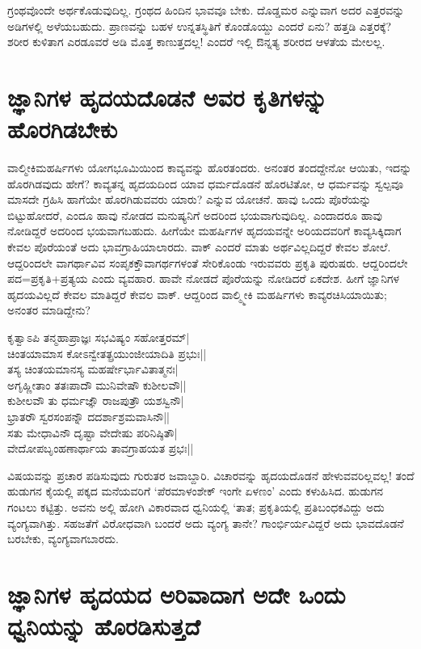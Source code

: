 ಗ್ರಂಥವೊಂದೇ ಅರ್ಥಕೊಡುವುದಿಲ್ಲ. ಗ್ರಂಥದ ಹಿಂದಿನ ಭಾವವೂ ಬೇಕು. ದೊಡ್ಡಮರ ಎನ್ನುವಾಗ ಅದರ ಎತ್ತರವನ್ನು ಅಡಿಗಳಲ್ಲಿ ಅಳೆಯಬಹುದು. ಪ್ರಾಣವನ್ನು ಬಹಳ ಉನ್ನತಸ್ಥಿತಿಗೆ ಕೊಂಡೊಯ್ದು ಎಂದರೆ ಏನು? ಹತ್ತಡಿ ಎತ್ತರಕ್ಕೆ? ಶರೀರ ಕುಳಿತಾಗ ಎರಡೂವರೆ ಅಡಿ ಮೊತ್ತ ಕಾಣುತ್ತದಲ್ಲ! ಎಂದರೆ ಇಲ್ಲಿ ಔನ್ನತ್ಯ ಶರೀರದ ಆಳತೆಯ ಮೇಲಲ್ಲ. 

\section*{ಜ್ಞಾನಿಗಳ ಹೃದಯದೊಡನೆ ಅವರ ಕೃತಿಗಳನ್ನು ಹೊರಗಿಡಬೇಕು}

ವಾಲ್ಮೀಕಿಮಹರ್ಷಿಗಳು ಯೋಗಭೂಮಿಯಿಂದ ಕಾವ್ಯವನ್ನು ಹೊರತಂದರು. ಅನಂತರ ತಂದದ್ದೇನೋ ಆಯಿತು, ಇದನ್ನು ಹೊರಗಿಡವುದು ಹೇಗೆ? ಕಾವ್ಯತನ್ನ ಹೃದಯದಿಂದ ಯಾವ ಧರ್ಮದೊಡನೆ ಹೊರಟಿತೋ, ಆ ಧರ್ಮವನ್ನು ಸ್ವಲ್ಪವೂ ಮಾಸದೇ ಗ್ರಹಿಸಿ ಹಾಗೆಯೇ ಹೊರಗಿಡುವವರು ಯಾರು? ಎನ್ನುವ ಯೋಚನೆ. ಹಾವು ಒಂದು ಪೊರೆಯನ್ನು ಬಿಟ್ಟುಹೋದರೆ, ಎಂದೂ ಹಾವು ನೋಡದ ಮನುಷ್ಯನಿಗೆ ಅದರಿಂದ ಭಯವಾಗುವುದಿಲ್ಲ. ಎಂದಾದರೂ ಹಾವು ನೋಡಿದ್ದರೆ ಅದರಿಂದ ಭಯವಾಗಬಹುದು. ಹೀಗೆಯೇ ಮಹರ್ಷಿಗಳ ಹೃದಯವನ್ನೇ ಅರಿಯದವರಿಗೆ ಕಾವ್ಯಸಿಕ್ಕಿದಾಗ ಕೇವಲ ಪೊರೆಯಂತೆ ಅದು ಭಾವಗ್ರಾಹಿಯಾಲಾರದು. ವಾಕ್ ಎಂದರೆ ಮಾತು ಅರ್ಥವಿಲ್ಲದಿದ್ದರೆ ಕೇವಲ ಶೋಲೆ. ಆದ್ದರಿಂದಲೇ ವಾಗರ್ಥಾವಿವ ಸಂಪೃಕಕ್ತೌವಾಗರ್ಥಗಳಂತೆ ಸೇರಿಕೊಂಡು ಇರುವವರು ಪ್ರಕೃತಿ ಪುರುಷರು. ಆದ್ದರಿಂದಲೇ ಪದ=ಪ್ರಕೃತಿ+ಪ್ರತ್ಯಯ ಎಂದು ವ್ಯವಹಾರ. ಹಾವೇ ನೋಡದೆ ಪೊರೆಯನ್ನು ನೋಡಿದರೆ ಏಕದೇಶ. ಹೀಗೆ ಜ್ಞಾನಿಗಳ ಹೃದಯವಿಲ್ಲದೆ ಕೇವಲ ಮಾತಿದ್ದರೆ ಕೇವಲ ವಾಕ್. ಆದ್ದರಿಂದ ವಾಲ್ಮ್ಮೀಕಿ ಮಹರ್ಷಿಗಳು ಕಾವ್ಯರಚಿಸಿಯಾಯಿತು; ಅನಂತರ ಮಾಡಿದ್ದೇನು? 

\begin{shloka}
ಕೃತ್ವಾಽಪಿ ತನ್ಮಹಾಪ್ರಾಜ್ಞಃ ಸಭವಿಷ್ಯಂ ಸಹೋತ್ತರಮ್|\label{238}\\
ಚಿಂತಯಾಮಾಸ ಕೋಽನ್ವೇತತ್ಪ್ರಯುಂಜೀಯಾದಿತಿ ಪ್ರಭುಃ||\\
ತಸ್ಯ ಚಿಂತಯಮಾನಸ್ಯ ಮಹರ್ಷೇರ್ಭಾವಿತಾತ್ಮನಃ|\\
ಅಗೃಹ್ಣೀತಾಂ ತತಃಪಾದೌ ಮುನಿವೇಷೌ ಕುಶೀಲವೌ||\\
ಕುಶೀಲವೌ ತು ಧರ್ಮಜ್ಞೌ ರಾಜಪುತ್ರೌ ಯಶಸ್ವಿನೌ|\\
ಭ್ರಾತರೌ ಸ್ವರಸಂಪನ್ನೌ ದದರ್ಶಾಶ್ರಮವಾಸಿನೌ||\\
ಸತು ಮೇಧಾವಿನೌ ದೃಷ್ಟಾ ವೇದೇಷು ಪರಿನಿಷ್ಠಿತೌ|\\
ವೇದೋಪಬೃಂಹಣಾರ್ಥಾಯ ತಾವಗ್ರಾಹಯತ ಪ್ರಭಃ||
\end{shloka}

ವಿಷಯವನ್ನು ಪ್ರಚಾರ ಪಡಿಸುವುದು ಗುರುತರ ಜವಾಬ್ದಾರಿ. ವಿಚಾರವನ್ನು ಹೃದಯದೊಡನೆ ಹೇಳುವವರಿಲ್ಲವಲ್ಲ! ತಂದೆ ಹುಡುಗನ ಕೈಯಲ್ಲಿ ಪಕ್ಕದ ಮನೆಯವರಿಗೆ `ಪೆರಮಾಳಂಶೇಕ್ ಇಂಗೇ ಏಳಣಂ' ಎಂದು ಕಳುಹಿಸಿದ. ಹುಡುಗನ ಗಂಟಲು ಕಟ್ಟಿತ್ತು. ಅವನು ಅಲ್ಲಿ ಹೋಗಿ ವಿಕಾರವಾದ ಧ್ವನಿಯಲ್ಲಿ `ತಾತ; ಪ್ರಕೃತಿಯಲ್ಲಿ ಪ್ರತಿಬಂಧಕವಿದ್ದು ಅದು ವ್ಯಂಗ್ಯವಾಗಿತ್ತು. ಸಹಜತೆಗೆ ವಿರೋಧವಾಗಿ ಬಂದರೆ ಅದು ವ್ಯಂಗ್ಯ ತಾನೇ? ಗಾಂರ್ಭಿರ್ಯವಿದ್ದರೆ ಅದು ಭಾವದೊಡನೆ ಬರಬೇಕು, ವ್ಯಂಗ್ಯವಾಗಬಾರದು.

\section*{ಜ್ಞಾನಿಗಳ ಹೃದಯದ ಅರಿವಾದಾಗ ಅದೇ ಒಂದು ಧ್ವನಿಯನ್ನು  ಹೊರಡಿಸುತ್ತದೆ}

